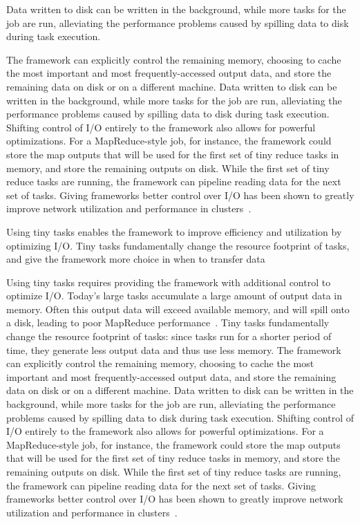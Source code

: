 {%

Data written to disk can be written in the background, while more tasks for the
job are run, alleviating the performance problems caused by spilling data to disk
during task execution.


The framework can
explicitly control the remaining memory, choosing to cache the most important
and most frequently-accessed output data, and store the remaining data on disk
or on a different machine. Data written to disk can be written in the
background, while more tasks for the job are run, alleviating the performance
problems caused by spilling data to disk during task execution.
Shifting control of I/O entirely to the framework also allows for
powerful optimizations.  For a MapReduce-style job, for instance, the
framework could store the map outputs that will be used for the first set of
tiny reduce tasks in memory, and store the remaining outputs on disk. While
the first set of tiny reduce tasks are running, the framework can pipeline
reading data for the next set of tasks.  Giving frameworks better control over
I/O has been shown
to greatly improve network utilization and performance in
clusters~\cite{chowdhury2011managing, chowdhury2012coflow}.


Using tiny tasks enables the framework to improve efficiency and utilization
by optimizing I/O. Tiny tasks fundamentally change the resource footprint of
tasks, and give the framework more choice in when to transfer data

Using tiny tasks requires providing the framework with additional control to optimize I/O.
Today's large tasks accumulate a large amount of output data in memory.
Often this output data will exceed available memory,
and will spill onto a disk, leading to poor MapReduce
performance~\cite{lipcon2012optimizing}. Tiny tasks fundamentally change the
resource footprint of tasks: since tasks run for a shorter period of time,
they generate less output data and thus use less memory. The framework can
explicitly control the remaining memory, choosing to cache the most important
and most frequently-accessed output data, and store the remaining data on disk
or on a different machine. Data written to disk can be written in the
background, while more tasks for the job are run, alleviating the performance
problems caused by spilling data to disk during task execution.
Shifting control of I/O entirely to the framework also allows for
powerful optimizations.  For a MapReduce-style job, for instance, the
framework could store the map outputs that will be used for the first set of
tiny reduce tasks in memory, and store the remaining outputs on disk. While
the first set of tiny reduce tasks are running, the framework can pipeline
reading data for the next set of tasks.  Giving frameworks better control over
I/O has been shown
to greatly improve network utilization and performance in
clusters~\cite{chowdhury2011managing, chowdhury2012coflow}.
}
